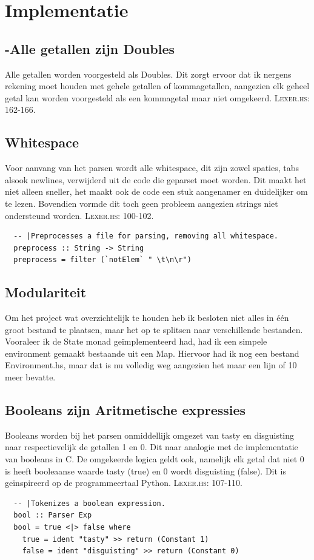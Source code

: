 \documentclass[12pt,a4paper]{report}
\begin{document}
\chapter{Implementatie}
\section{-Alle getallen zijn Doubles}
Alle getallen worden voorgesteld als Doubles. Dit zorgt ervoor dat ik nergens rekening moet houden met gehele getallen of kommagetallen, aangezien elk geheel getal kan worden voorgesteld als een kommagetal maar niet omgekeerd. \textsc{Lexer.hs: 162-166.}
\section{Whitespace}
Voor aanvang van het parsen wordt alle whitespace, dit zijn zowel spaties, tabs alsook newlines, verwijderd uit de code die geparset moet worden. Dit maakt het niet alleen sneller, het maakt ook de code een stuk aangenamer en duidelijker om te lezen. Bovendien vormde dit toch geen probleem aangezien strings niet ondersteund worden. \textsc{Lexer.hs: 100-102.}
\begin{lstlisting}
  -- |Preprocesses a file for parsing, removing all whitespace.
  preprocess :: String -> String
  preprocess = filter (`notElem` " \t\n\r")
\end{lstlisting}
\section{Modulariteit}
Om het project wat overzichtelijk te houden heb ik besloten niet alles in één groot bestand te plaatsen, maar het op te splitsen naar verschillende bestanden. Vooraleer ik de State monad geïmplementeerd had, had ik een simpele environment gemaakt bestaande uit een Map. Hiervoor had ik nog een bestand Environment.hs, maar dat is nu volledig weg aangezien het maar een lijn of 10 meer bevatte.
\section{Booleans zijn Aritmetische expressies}
Booleans worden bij het parsen onmiddellijk omgezet van tasty en disguisting naar respectievelijk de getallen 1 en 0. Dit naar analogie met de implementatie van booleans in C. De omgekeerde logica geldt ook, namelijk elk getal dat niet 0 is heeft booleaanse waarde tasty (true) en 0 wordt disguisting (false). Dit is geïnspireerd op de programmeertaal Python. \textsc{Lexer.hs: 107-110.}
\begin{lstlisting}
  -- |Tokenizes a boolean expression.
  bool :: Parser Exp
  bool = true <|> false where
    true = ident "tasty" >> return (Constant 1)
    false = ident "disguisting" >> return (Constant 0)
\end{lstlisting}
\end{document}

